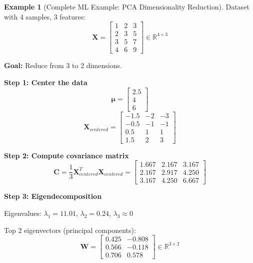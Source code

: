 \documentclass[12pt,a4paper]{article}
\theoremstyle{definition}
\newtheorem{example}{Example}[section]
\begin{document}
\begin{example}[Complete ML Example: PCA Dimensionality Reduction]
Dataset with 4 samples, 3 features:
\begin{equation}
\mathbf{X} = \begin{bmatrix}
1 & 2 & 3 \\
2 & 3 & 5 \\
3 & 5 & 7 \\
4 & 6 & 9
\end{bmatrix} \in \mathbb{R}^{4 \times 3}
\end{equation}

\textbf{Goal:} Reduce from 3 to 2 dimensions.

\textbf{Step 1: Center the data}
\begin{equation}
\boldsymbol{\mu} = \begin{bmatrix} 2.5 \\ 4 \\ 6 \end{bmatrix}
\end{equation}
\begin{equation}
\mathbf{X}_{centered} = \begin{bmatrix}
-1.5 & -2 & -3 \\
-0.5 & -1 & -1 \\
0.5 & 1 & 1 \\
1.5 & 2 & 3
\end{bmatrix}
\end{equation}

\textbf{Step 2: Compute covariance matrix}
\begin{equation}
\mathbf{C} = \frac{1}{3}\mathbf{X}_{centered}^T\mathbf{X}_{centered} = \begin{bmatrix}
1.667 & 2.167 & 3.167 \\
2.167 & 2.917 & 4.250 \\
3.167 & 4.250 & 6.667
\end{bmatrix}
\end{equation}

\textbf{Step 3: Eigendecomposition}

Eigenvalues: $\lambda_1 = 11.01$, $\lambda_2 = 0.24$, $\lambda_3 \approx 0$

Top 2 eigenvectors (principal components):
\begin{equation}
\mathbf{W} = \begin{bmatrix}
0.425 & -0.808 \\
0.566 & -0.118 \\
0.706 & 0.578
\end{bmatrix} \in \mathbb{R}^{3 \times 2}
\end{equation}


\end{example}
\end{document}
